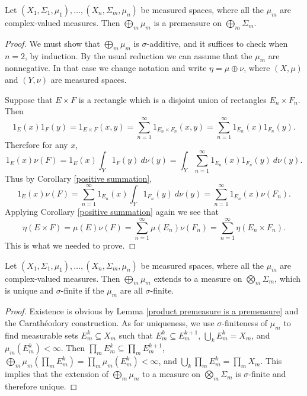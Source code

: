 \begin{lemma}
\label{product premeasure is a premeasure}
Let $(X_1, \Sigma_1, \mu_1), \dots, (X_n, \Sigma_m, \mu_n)$ be measured spaces, where all the $\mu_m$ are complex-valued measures.
Then $\bigoplus_m \mu_m$ is a premeasure on $\bigoplus_m \Sigma_m$.
\end{lemma}
\begin{proof}
We must show that $\bigoplus_m \mu_m$ is $\sigma$-additive, and it suffices to check when $n = 2$, by induction.
By the usual reduction we can assume that the $\mu_m$ are nonnegative.
In that case we change notation and write $\eta = \mu \oplus \nu$, where $(X, \mu)$ and $(Y, \nu)$ are measured spaces.

Suppose that $E \times F$ is a rectangle which is a disjoint union of rectangles $E_n \times F_n$.
Then
$$1_E(x) 1_F(y) = 1_{E \times F}(x, y) = \sum_{n=1}^\infty 1_{E_n \times F_n}(x, y) = \sum_{n=1}^\infty 1_{E_n}(x) 1_{F_n}(y).$$
Therefore for any $x$,
$$1_E(x) \nu(F) = 1_E(x) \int_Y 1_F(y)~d\nu(y) = \int_Y \sum_{n=1}^\infty 1_{E_n}(x) 1_{F_n}(y) ~d\nu(y).$$
Thus by Corollary \ref{positive summation},
$$1_E(x) \nu(F) = \sum_{n=1}^\infty 1_{E_n}(x) \int_Y 1_{F_n}(y)~d\nu(y) = \sum_{n=1}^\infty 1_{E_n}(x)\nu(F_n).$$
Applying Corollary \ref{positive summation} again we see that
$$\eta(E \times F) = \mu(E) \nu(F) = \sum_{n=1}^\infty \mu(E_n) \nu(F_n) = \sum_{n=1}^\infty \eta(E_n \times F_n).$$
This is what we needed to prove.
\end{proof}

\begin{corollary}
Let $(X_1, \Sigma_1, \mu_1), \dots, (X_n, \Sigma_m, \mu_n)$ be measured spaces, where all the $\mu_m$ are complex-valued measures.
Then $\bigoplus_m \mu_m$ extends to a measure on $\bigotimes_m \Sigma_m$, which is unique and $\sigma$-finite if the $\mu_m$ are all $\sigma$-finite.
\end{corollary}
\begin{proof}
Existence is obvious by Lemma \ref{product premeasure is a premeasure} and the Carathéodory construction.
As for uniqueness, we use $\sigma$-finiteness of $\mu_m$ to find measurable sets $E_m^k \subseteq X_m$ such that $E_m^k \subseteq E_m^{k+1}$, $\bigcup_k E_m^k = X_m$, and $\mu_m(E_m^k) < \infty$.
Then $\prod_m E_m^k \subseteq \prod_m E_m^{k+1}$, $\bigoplus_m \mu_m(\prod_m E_m^k) = \prod_m \mu_m(E_m^k) < \infty$, and $\bigcup_k \prod_m E_m^k = \prod_m X_m$.
This implies that the extension of $\bigoplus_m \mu_m$ to a measure on $\bigotimes_m \Sigma_m$ is $\sigma$-finite and therefore unique.
\end{proof}

